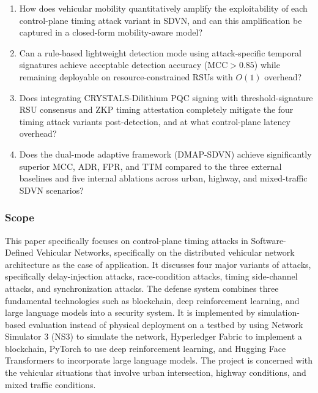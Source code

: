 \begin{enumerate}

\item[\textbf{RQ1.}] How does vehicular mobility quantitatively
amplify the exploitability of each control-plane timing attack
variant in SDVN, and can this amplification be captured in a
closed-form mobility-aware model?

\item[\textbf{RQ2.}] Can a rule-based lightweight detection mode
using attack-specific temporal signatures achieve acceptable
detection accuracy ($\mathrm{MCC} > 0.85$) while remaining
deployable on resource-constrained RSUs with $O(1)$ overhead?

\item[\textbf{RQ3.}] Does integrating CRYSTALS-Dilithium PQC
signing with threshold-signature RSU consensus and ZKP timing
attestation completely mitigate the four timing attack variants
post-detection, and at what control-plane latency overhead?

\item[\textbf{RQ4.}] Does the dual-mode adaptive framework
(DMAP-SDVN) achieve significantly superior MCC, ADR, FPR, and
TTM compared to the three external baselines and five internal
ablations across urban, highway, and mixed-traffic SDVN scenarios?
\end{enumerate}

\subsubsection{Scope}

This paper specifically focuses on control-plane timing attacks in Software-Defined Vehicular Networks, specifically on the distributed vehicular network architecture as the case of application. It discusses four major variants of attacks, specifically delay-injection attacks, race-condition attacks, timing side-channel attacks, and synchronization attacks. The defense system combines three fundamental technologies such as blockchain, deep reinforcement learning, and large language models into a security system. It is implemented by simulation-based evaluation instead of physical deployment on a testbed by using Network Simulator 3 (NS3) to simulate the network, Hyperledger Fabric to implement a blockchain, PyTorch to use deep reinforcement learning, and Hugging Face Transformers to incorporate large language models. The project is concerned with the vehicular situations that involve urban intersection, highway conditions, and mixed traffic conditions.

